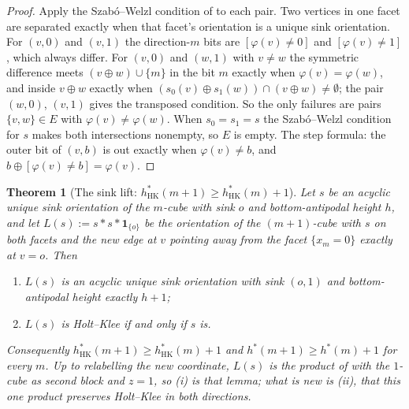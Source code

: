 \documentclass[11pt]{article}
\theoremstyle{plain}
\newtheorem{theorem}{Theorem}[section]
\theoremstyle{definition}
\begin{document}
\begin{proof}
Apply the Szab\'o--Welzl condition of  to each
pair. Two vertices in one facet are separated exactly when that facet's
orientation is a unique sink orientation. For $(v,0)$ and $(v,1)$ the
direction-$m$ bits are $[\varphi(v)\ne0]$ and $[\varphi(v)\ne1]$, which
always differ. For $(v,0)$ and $(w,1)$ with $v\ne w$ the symmetric
difference meets $(v\oplus w)\cup\{m\}$ in the bit $m$ exactly when
$\varphi(v)=\varphi(w)$, and inside $v\oplus w$ exactly when
$(s_0(v)\oplus s_1(w))\cap(v\oplus w)\ne\emptyset$; the pair $(w,0)$,
$(v,1)$ gives the transposed condition. So the only failures are pairs
$\{v,w\}\in E$ with $\varphi(v)\ne\varphi(w)$. When $s_0=s_1=s$ the
Szab\'o--Welzl condition for $s$ makes both intersections nonempty, so $E$
is empty. The step formula: the outer bit of $(v,b)$ is out exactly when
$\varphi(v)\ne b$, and $b\oplus[\varphi(v)\ne b]=\varphi(v)$.
\end{proof}

\begin{theorem}[The sink lift: $h^{\ast}_{\mathrm{HK}}(m+1)\ge h^{\ast}_{\mathrm{HK}}(m)+1$]\label{prop:sink-lift}
Let $s$ be an acyclic unique sink orientation of the $m$-cube with sink $o$
and bottom-antipodal height $h$, and let
$L(s):=s\!*\!s\!*\!\mathbf 1_{\{o\}}$ be the orientation of the
$(m+1)$-cube with $s$ on both facets and the new edge at $v$ pointing away
from the facet $\{x_m=0\}$ exactly at $v=o$. Then
\begin{enumerate}
\item[(i)] $L(s)$ is an acyclic unique sink orientation with sink $(o,1)$
and bottom-antipodal height exactly $h+1$;
\item[(ii)] $L(s)$ is Holt--Klee if and only if $s$ is.
\end{enumerate}
Consequently $h^{\ast}_{\mathrm{HK}}(m+1)\ge h^{\ast}_{\mathrm{HK}}(m)+1$
and $h^{\ast}(m+1)\ge h^{\ast}(m)+1$ for every $m$. Up to relabelling the
new coordinate, $L(s)$ is the product of  with the
$1$-cube as second block and $z=1$, so (i) is that lemma; what is new is
(ii), that this one product preserves Holt--Klee in both directions.
\end{theorem}
\end{document}

